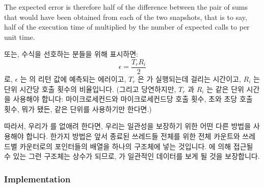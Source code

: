{	The expected error is therefore half of the difference between
	the pair of sums that would have been obtained from each of the
	two snapshots, that is to say, half of the execution time of
	 multiplied by the number of expected calls to
	 per unit time.
	\fi

	또는, 수식을 선호하는 분들을 위해 표시하면:
	\begin{equation}
	\epsilon = \frac{T_r R_i}{2}
	\end{equation}
	로, $\epsilon$ 는  의 리턴 값에 예측되는 에러이고,
	$T_r$ 은  가 실행되는데 걸리는 시간이고, $R_i$ 는 단위
	시간당  호출 횟수의 비율입니다.
	(그리고 당연하지만, $T_r$ 과 $R_i$ 는 같은 단위 시간을 사용해야 합니다:
	마이크로세컨드와 마이크로세컨드당 호출 횟수, 초와 초당 호출 횟수, 뭐가
	됐든, 같은 단위를 사용하기만 한다면.)
	\iffalse

	Or, for those who prefer equations:
	\begin{equation}
	\epsilon = \frac{T_r R_i}{2}
	\end{equation}
	where $\epsilon$ is the expected error in \co{read_count()}'s
	return value,
	$T_r$ is the time that \co{read_count()} takes to execute,
	and $R_i$ is the rate of \co{inc_count()} calls per unit time.
	(And of course, $T_r$ and $R_i$ should use the same units of
	time: microseconds and calls per microsecond, seconds and calls
	per second, or whatever, as long as they are the same units.)
	\fi
} \QuickQuizEnd

따라서, 우리가  를 없애려 한다면, 우리는 일관성을 보장하기 위한
어떤 다른 방법을 사용해야 합니다.
한가지 방법은 앞서 종료된 쓰레드들 전체를 위한 전체 카운트와 쓰레드별
카운터로의 포인터들의 배열을 하나의 구조체에 넣는 것입니다.
 에 의해 접근될 수 있는 그런 구조체는 상수가 되므로,
 가 일관적인 데이터를 보게 될 것을 보장합니다.
\iffalse

Therefore, if we are to dispense with \co{final_mutex}, we will need
to come up with some other method for ensuring consistency.
One approach is to place the total count for all previously exited
threads and the array of pointers to the per-thread counters into a single
structure.
Such a structure, once made available to \co{read_count()}, is
held constant, ensuring that \co{read_count()} sees consistent data.
\fi

\subsubsection{Implementation}

